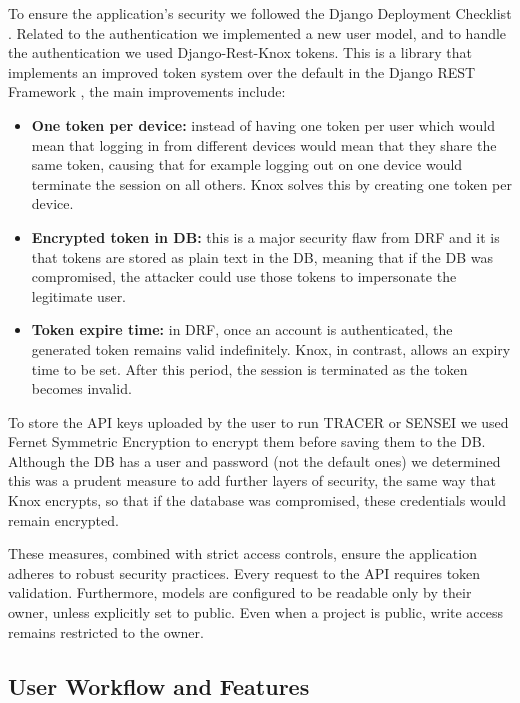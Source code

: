 To ensure the application's security we followed the Django Deployment Checklist \autocite{DeploymentChecklistDjango}.
Related to the authentication we implemented a new user model,
and to handle the authentication we used Django-Rest-Knox \autocite{DjangoRestKnox} tokens.
This is a library that implements an improved token system over the default in the Django REST Framework \autocite{DjangoRESTFramework},
the main improvements include:
\begin{itemize}
  \item \textbf{One token per device:}
    instead of having one token per user
    which would mean that logging in from different devices
    would mean that they share the same token,
    causing that for example
    logging out on one device would terminate the session on all others.
    Knox solves this by creating one token per device.

  \item \textbf{Encrypted token in \ac{DB}:}
    this is a major security flaw from \ac{DRF}
    and it is that tokens are stored as plain text in the \ac{DB},
    meaning that if the \ac{DB} was compromised,
    the attacker could use those tokens to impersonate the legitimate user.

  \item \textbf{Token expire time:}
    in \ac{DRF}, once an account is authenticated, the generated token remains valid indefinitely.
    Knox, in contrast, allows an expiry time to be set.
    After this period, the session is terminated as the token becomes invalid.
\end{itemize}

To store the \ac{API} keys uploaded by the user to run \ac{TRACER} or SENSEI
we used Fernet Symmetric Encryption \autocite{FernetSymmetricEncryption}
to encrypt them before saving them to the \ac{DB}.
Although the \ac{DB} has a user and password (not the default ones)
we determined this was a prudent measure to add further layers of security,
the same way that Knox encrypts, so that
if the database was compromised, these credentials would remain encrypted.

These measures, combined with strict access controls,
ensure the application adheres to robust security practices.
Every request to the \ac{API} requires token validation.
Furthermore, models are configured to be readable only by their owner,
unless explicitly set to public.
Even when a project is public, write access remains restricted to the owner.


\subsection{User Workflow and Features}

